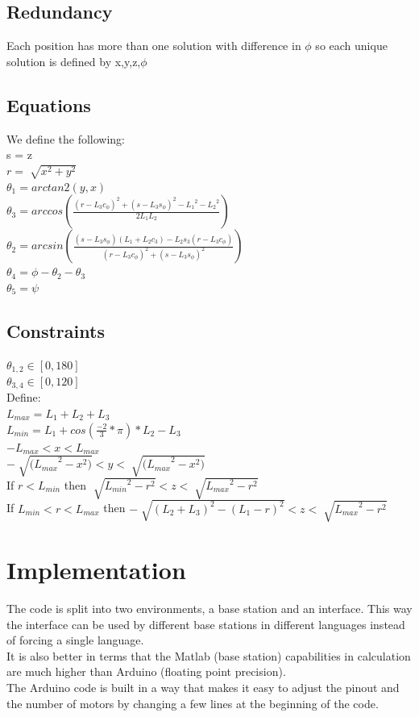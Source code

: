 \documentclass[11pt,a4paper]{report}
\begin{document}
\subsection{Redundancy}
Each position has more than one solution with difference in $\phi$  so each unique solution is defined by x,y,z,$\phi$
\subsection{Equations}
We define the following:\\
s = z\\
$r = \sqrt[]{x^2+y^2}$\\
$\theta_1 = arctan2(y,x)$\\
$\theta_3 = arccos(\frac{(r-L_3c_{\phi})^2 + (s-L_3s_{\phi})^2 - {L_{1}}^2 - {L_{2}}^2 }{2L_1L_2})$\\
$\theta_2 = arcsin(\frac{(s-L_3s_{\phi})(L_1+L_2c_3)-L_2s_3(r-L_3c_{\phi})}{(r-L_3c_{\phi})^2 + (s-L_3s_{\phi})^2})$\\
$\theta_4 = \phi - \theta_2 - \theta_3$\\
$\theta_5 = \psi$\\
\subsection{Constraints}
$\theta_{1,2} \in [0,180]$\\
$\theta_{3,4} \in [0,120]$\\
Define:\\
$L_{max} = L_1 + L_2 + L_3$\\
$L_{min} = L_1 + cos(\frac{-2}{3}*\pi)*L_2 - L_3$\\
$-L_{max} < x < L_{max}$\\
$-\sqrt[]{{(L_{max}}^2 - x^2)} < y < \sqrt[]{{(L_{max}}^2 - x^2)}$\\
If $r < L_{min}$ then $\sqrt[]{{L_{min}}^2 - r^2} < z < \sqrt[]{{L_{max}}^2 - r^2}$\\
If $L_{min} < r < L_{max}$ then $-\sqrt[]{(L_2+L_3)^2 - (L_1 - r)^2} < z < \sqrt[]{{L_{max}}^2 - r^2}$
\section{Implementation}
The code is split into two environments, a base station and an interface. This way the interface can be used by different base stations in different languages instead of forcing a single language.\\
It is also better in terms that the Matlab (base station) capabilities in calculation are much higher than Arduino (floating point precision).\\
The Arduino code is built in a way that makes it easy to adjust the pinout and the number of motors by changing a few lines at the beginning of the code.\\
\end{document}
